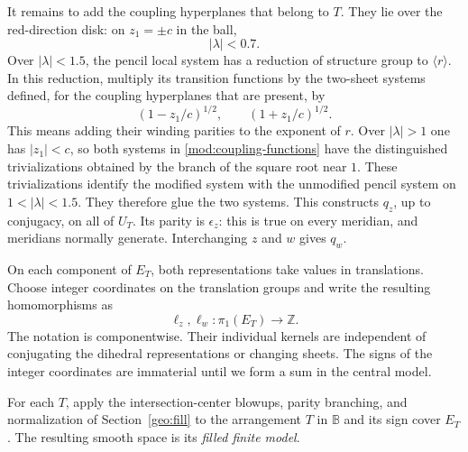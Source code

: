 \documentclass[11pt,reqno]{amsart}
\numberwithin{equation}{section}
\theoremstyle{definition}
\theoremstyle{remark}
\newcommand{\Z}{\mathbb Z}
\newcommand{\BB}{\mathbb B}
\begin{document}
It remains to add the coupling hyperplanes that belong to $T$.
They lie over the red-direction disk: on $z_1=\pm c$ in the ball,
\[
 |\lambda|<0.7.
\]
Over $|\lambda|<1.5$, the pencil local system has a reduction of
structure group to $\langle r\rangle$.  In this reduction, multiply
its transition functions by the two-sheet systems defined, for the
coupling hyperplanes that are present, by
\begin{equation}\label{mod:coupling-functions}
 (1-z_1/c)^{1/2},\qquad (1+z_1/c)^{1/2}.
\end{equation}
This means adding their winding parities to the exponent of $r$.
Over $|\lambda|>1$ one has $|z_1|<c$, so both systems in
\eqref{mod:coupling-functions} have the distinguished trivializations
obtained by the branch of the square root near $1$.  These
trivializations identify the modified system with the unmodified
pencil system on $1<|\lambda|<1.5$.  They therefore glue the two
systems.  This constructs $q_z$, up to conjugacy, on all of $U_T$.
Its parity is $\epsilon_z$: this is true on every meridian, and
meridians normally generate.  Interchanging $z$ and $w$ gives $q_w$.

On each component of $E_T$, both representations take values in
translations.  Choose integer coordinates on the translation groups
and write the resulting homomorphisms as
\[
 \ell_z,\ell_w:\pi_1(E_T)\longrightarrow\Z.
\]
The notation is componentwise.  Their individual kernels are
independent of conjugating the dihedral representations or changing
sheets.  The signs of the integer coordinates are immaterial until
we form a sum in the central model.

For each $T$, apply the intersection-center blowups, parity branching,
and normalization of Section~\ref{geo:fill} to the arrangement $T$ in
$\BB$ and its sign cover $E_T$.  The resulting smooth space is its
\emph{filled finite model}.
\end{document}
